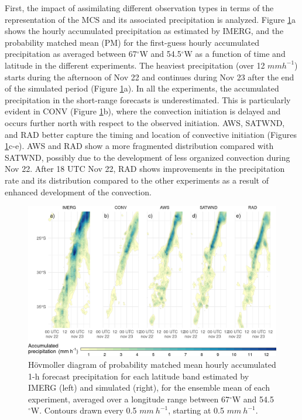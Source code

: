 \documentclass[final,5p,times,twocolumn,authoryear]{elsarticle} %
\begin{document}
First, the impact of assimilating different observation types in terms of the representation of the MCS and its associated precipitation is analyzed. Figure \ref{fig:pp-hov}a shows the hourly accumulated precipitation as estimated by IMERG, and the probability matched mean (PM) \citep{clark2017} for the first-guess hourly accumulated precipitation as averaged between 67\(^{\circ}\)W and 54.5\(^{\circ}\)W as a function of time and latitude in the different experiments. The heaviest precipitation (over 12 \(mmh^{-1}\)) starts during the afternoon of Nov 22 and continues during Nov 23 after the end of the simulated period (Figure \ref{fig:pp-hov}a). In all the experiments, the accumulated precipitation in the short-range forecasts is underestimated. This is particularly evident in CONV (Figure \ref{fig:pp-hov}b), where the convection initiation is delayed and occurs further north with respect to the observed initiation. AWS, SATWND, and RAD better capture the timing and location of convective initiation (Figures \ref{fig:pp-hov}c-e). AWS and RAD show a more fragmented distribution compared with SATWND, possibly due to the development of less organized convection during Nov 22. After 18 UTC Nov 22, RAD shows improvements in the precipitation rate and its distribution compared to the other experiments as a result of enhanced development of the convection.



\begin{figure}[h]

{\centering \includegraphics{../figures/pp-hov-1} 

}

\caption{Hövmoller diagram of probability matched mean hourly accumulated 1-h forecast precipitation for each latitude band estimated by IMERG (left) and simulated (right), for the ensemble mean of each experiment, averaged over a longitude range between 67\(^{\circ}\)W and 54.5\(^{\circ}\)W. Contours drawn every 0.5 \(mm\ h^{-1}\), starting at 0.5 \(mm\ h^{-1}\).}\label{fig:pp-hov}
\end{figure}
\end{document}
